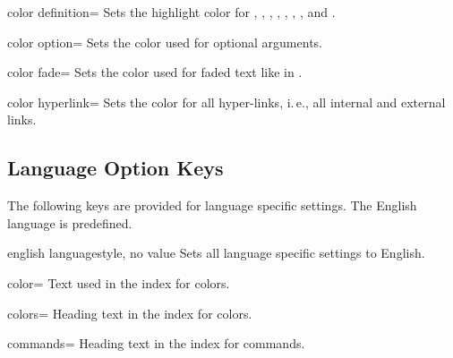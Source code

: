 \begin{docTcbKey}[][doc updated={2019-09-18}]{color definition}{=}{}
  Sets the highlight color for , ,
  , , , ,
  , and .
\end{docTcbKey}

\begin{docTcbKey}{color option}{=}{}
  Sets the color used for optional arguments.
\end{docTcbKey}

\begin{docTcbKey}{color fade}{=}{}
  Sets the color used for faded text like 
  in .
\end{docTcbKey}


\begin{docTcbKey}{color hyperlink}{=}{}
  Sets the color for all hyper-links, i.\,e., all internal and external links.
\end{docTcbKey}


\clearpage
\subsection{Language Option Keys}

The following keys are provided for language specific settings.
The English language is predefined.

\begin{docTcbKey}{english language}{}{style, no value}
  Sets all language specific settings to English.
\end{docTcbKey}

\begin{langTcbKey}{color}{=}{}
  Text used in the index for colors.
\end{langTcbKey}

\begin{langTcbKey}{colors}{=}{}
  Heading text in the index for colors.
\end{langTcbKey}

\begin{langTcbKey}[][doc new={2022-06-20}]{commands}{=}{}
  Heading text in the index for commands.
\end{langTcbKey}

